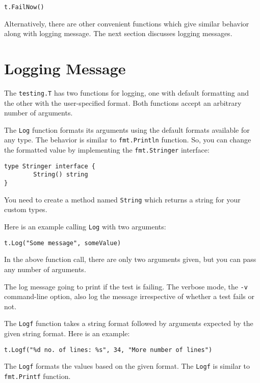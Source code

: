 \begin{lstlisting}[numbers=none]
t.FailNow()
\end{lstlisting}

Alternatively, there are other convenient functions which give similar
behavior along with logging message.  The next section discusses
logging messages.

\section{Logging Message}

The \texttt{testing.T} has two functions for logging, one with default
formatting and the other with the user-specified format.  Both
functions accept an arbitrary number of arguments.

The \texttt{Log} function formats its arguments using the default
formats available for any type.  The behavior is similar
to \texttt{fmt.Println} function.  So, you can change the formatted
value by implementing the \texttt{fmt.Stringer} interface:

\begin{lstlisting}[numbers=none]
type Stringer interface {
        String() string
}
\end{lstlisting}

You need to create a method named \texttt{String} which returns a
string for your custom types.

Here is an example calling \texttt{Log} with two arguments:

\begin{lstlisting}[numbers=none]
t.Log("Some message", someValue)
\end{lstlisting}

In the above function call, there are only two arguments given, but
you can pass any number of arguments.

The log message going to print if the test is failing.  The verbose
mode, the \texttt{-v} command-line option, also log the message
irrespective of whether a test fails or not.

The \texttt{Logf} function takes a string format followed by arguments
expected by the given string format.  Here is an example:

\begin{lstlisting}[numbers=none]
t.Logf("%d no. of lines: %s", 34, "More number of lines")
\end{lstlisting}

The \texttt{Logf} formats the values based on the given format.
The \texttt{Logf} is similar to \texttt{fmt.Printf} function.

